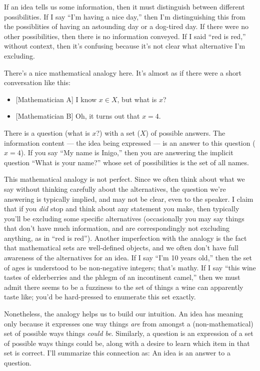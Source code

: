 \documentclass[11pt, oneside]{article}   	%
\newenvironment{answer}[1]
  {\renewcommand\theinnercustomthm{#1}\innercustomthm}
  {\endinnercustomthm}
\begin{document}
If an idea tells us some information, then it must distinguish between different
possibilities. If I say ``I'm having a nice day,'' then I'm distinguishing this
from the possiblities of having an astounding day or a dog-tired day.
If there were no other possibilities,
then there is no information conveyed. If I said
``red is red,'' without context, then it's confusing because it's not clear what
alternative I'm excluding.

There's a nice mathematical analogy here. It's almost as if there were a short
conversation like this:
\begin{itemize}
    \item{} [Mathematician A] I know $x\in X$, but what is $x$?
    \item{} [Mathematician B] Oh, it turns out that $x=4$.
\end{itemize}
There is a question (what is $x$?) with a set ($X$) of possible answers. The
information content --- the idea being expressed ---
is an answer to this question ($x=4$). If you say ``My name is Inigo,''
then you are answering the implicit question ``What is your name?'' whose set of
possibilities is the set of all names.

This mathematical analogy is not perfect.
Since we often think about what we say without thinking carefully about the
alternatives, the question we're answering
is typically implied, and may not be clear, even to
the speaker. I claim that if you {\em did} stop and think about any statement
you
make, then typically you'll be excluding some specific alternatives
(occasionally you may say things that don't have much information, and are
correspondingly not excluding anything, as in ``red is red'').
Another imperfection with the analogy is the fact that mathematical
sets are well-defined objects, and we often don't have full awareness of the
alternatives for an idea.
If I say ``I'm 10 years old,'' then the set of ages is understood
to be non-negative integers; that's mathy. If I say ``this wine tastes of
elderberries and the phlegm of an incontinent camel,'' then we must admit there
seems to be a fuzziness to the set of things a wine can apparently taste like;
you'd be hard-pressed to enumerate this set exactly.

Nonetheless, the analogy helps us to build our intuition.
An idea has meaning only because it expresses one way things
{\em are} from amongst a
(non-mathematical) set of possible ways things {\em could be}.
Similarly, a question is an expression of a set of possible ways things could
be, along with a desire to learn which item in that set is correct.
I'll summarize this
connection as:
\begin{answer}{4}
    An idea is an answer to a question.
\end{answer}
\end{document}
